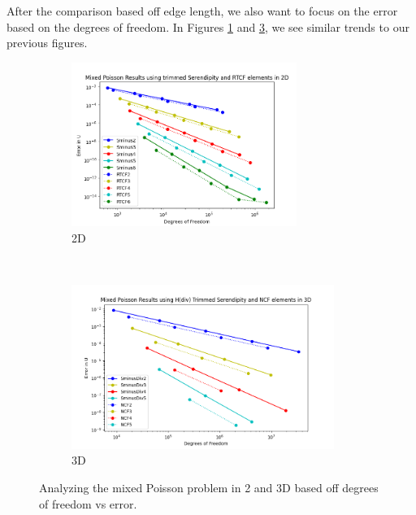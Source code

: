 \documentclass[manuscript,screen]{acmart}
\begin{document}
\noindent After the comparison based off edge length, we also want to focus on the error based on the degrees of freedom.  In Figures \ref{fig:2dMixedDofs} and \ref{fig:3dMixedDofs}, we see similar trends to our previous figures.

\begin{figure}[h!]
  \centering
  \begin{subfigure}[h]{0.45\textwidth}
    \centering
    \includegraphics[height=2.1in]{MixedPoisson-2d-SminusDiv_RTCF.png}
    \caption{2D}
    \label{fig:2dMixedDofs}
  \end{subfigure}
  ~
  \begin{subfigure}[h]{0.45\textwidth}
    \centering
    \includegraphics[height=2.1in]{MixedPoisson3d_TrimmedSerendipityNCF.png}
    \caption{3D}
    \label{fig:3dMixedDofs}
  \end{subfigure}
  \caption{Analyzing the mixed Poisson problem in 2 and 3D based off degrees of freedom vs error.}
\end{figure} 

\newpage

\end{document}

